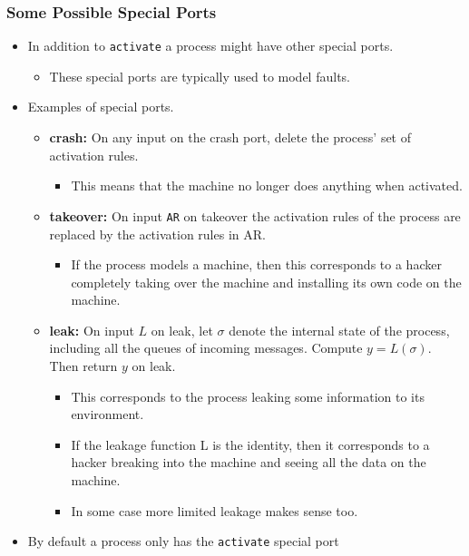 \documentclass[11pt]{article}
\begin{document}
\subsubsection{Some Possible Special Ports}
\label{sec:org5025cb9}
\begin{itemize}
\item In addition to \texttt{activate} a process might have other special ports.
\begin{itemize}
\item These special ports are typically used to model faults.
\end{itemize}

\item Examples of special ports.
\begin{itemize}
\item \textbf{crash:} On any input on the crash port, delete the process’ set of activation rules.
\begin{itemize}
\item This means that the machine no longer does anything when activated.
\end{itemize}
\item \textbf{takeover:} On input \texttt{AR} on takeover the activation rules of the process are replaced by the activation rules in AR.
\begin{itemize}
\item If the process models a machine, then this corresponds to a hacker completely taking over the machine and installing its own code on the machine.
\end{itemize}
\item \textbf{leak:} On input \(L\) on leak, let \(\sigma\) denote the internal state of the process, including all the queues of incoming messages. Compute \(y=L(\sigma)\). Then return \(y\) on leak.
\begin{itemize}
\item This corresponds to the process leaking some information to its environment.
\item If the leakage function L is the identity, then it corresponds to a hacker breaking into the machine and seeing all the data on the machine.
\item In some case more limited leakage makes sense too.
\end{itemize}
\end{itemize}

\item By default a process only has the \texttt{activate} special port
\end{itemize}
\end{document}
